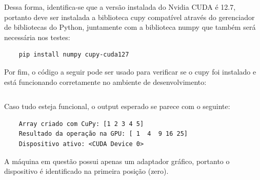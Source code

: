 \documentclass[12pt,a4paper]{article}
\begin{document}
Dessa forma, identifica-se que a versão instalada do Nvidia CUDA é 12.7, portanto deve ser instalada a biblioteca cupy compatível através do gerenciador de bibliotecas do Python, juntamente com a biblioteca numpy que também será necessária nos testes:

\begin{verbatim}
    pip install numpy cupy-cuda127
\end{verbatim}

Por fim, o código a seguir pode ser usado para verificar se o cupy foi instalado e está funcionando corretamente no ambiente de desenvolvimento:

\inputminted{python}{cfd_on_gpu/teste_cupy.py}

Caso tudo esteja funcional, o output esperado se parece com o seguinte:

\begin{verbatim}
    Array criado com CuPy: [1 2 3 4 5]
    Resultado da operação na GPU: [ 1  4  9 16 25]
    Dispositivo ativo: <CUDA Device 0>
\end{verbatim}

A máquina em questão possui apenas um adaptador gráfico, portanto o dispositivo é identificado na primeira posição (zero).
\end{document}
